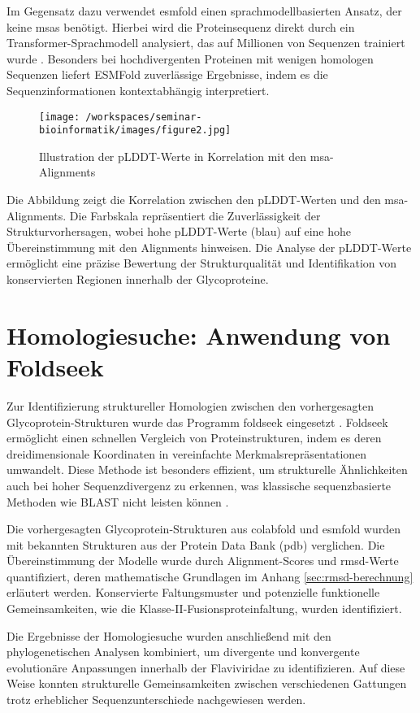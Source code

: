 Im Gegensatz dazu verwendet \gls{esmfold} einen sprachmodellbasierten Ansatz, der keine \glspl{msa} benötigt. Hierbei wird die Proteinsequenz direkt durch ein Transformer-Sprachmodell analysiert, das auf Millionen von Sequenzen trainiert wurde \autocite{linEvolutionaryscalePredictionAtomiclevel2023}. Besonders bei hochdivergenten Proteinen mit wenigen homologen Sequenzen liefert ESMFold zuverlässige Ergebnisse, indem es die Sequenzinformationen kontextabhängig interpretiert.

\begin{figure}[H]
    \centering
    \texttt{[image: /workspaces/seminar-bioinformatik/images/figure2.jpg]}
    \caption{Illustration der pLDDT-Werte in Korrelation mit den \gls{msa}-Alignments}
    \label{fig:figure2-orginal}
\end{figure}

Die Abbildung zeigt die Korrelation zwischen den pLDDT-Werten und den \gls{msa}-Alignments. Die Farbskala repräsentiert die Zuverlässigkeit der Strukturvorhersagen, wobei hohe pLDDT-Werte (blau) auf eine hohe Übereinstimmung mit den Alignments hinweisen. Die Analyse der pLDDT-Werte ermöglicht eine präzise Bewertung der Strukturqualität und Identifikation von konservierten Regionen innerhalb der Glycoproteine.

\section{Homologiesuche: Anwendung von Foldseek} \label{sec:foldseek}

Zur Identifizierung struktureller Homologien zwischen den vorhergesagten Glycoprotein-Strukturen wurde das Programm \gls{foldseek} eingesetzt \autocite{vankempenFastAccurateProtein2024}. Foldseek ermöglicht einen schnellen Vergleich von Proteinstrukturen, indem es deren dreidimensionale Koordinaten in vereinfachte Merkmalsrepräsentationen umwandelt. Diese Methode ist besonders effizient, um strukturelle Ähnlichkeiten auch bei hoher Sequenzdivergenz zu erkennen, was klassische sequenzbasierte Methoden wie BLAST nicht leisten können \autocite{Altschul1990}.

Die vorhergesagten Glycoprotein-Strukturen aus \gls{colabfold} und \gls{esmfold} wurden mit bekannten Strukturen aus der Protein Data Bank (\gls{pdb}) verglichen. Die Übereinstimmung der Modelle wurde durch Alignment-Scores und \gls{rmsd}-Werte quantifiziert, deren mathematische Grundlagen im Anhang \ref{sec:rmsd-berechnung} erläutert werden. Konservierte Faltungsmuster und potenzielle funktionelle Gemeinsamkeiten, wie die Klasse-II-Fusionsproteinfaltung, wurden identifiziert.

Die Ergebnisse der Homologiesuche wurden anschließend mit den phylogenetischen Analysen kombiniert, um divergente und konvergente evolutionäre Anpassungen innerhalb der Flaviviridae zu identifizieren. Auf diese Weise konnten strukturelle Gemeinsamkeiten zwischen verschiedenen Gattungen trotz erheblicher Sequenzunterschiede nachgewiesen werden.